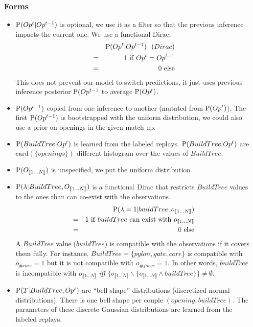 \subsubsection{Forms}
\begin{itemize}
\item $\mathrm{P}(Op^t | Op^{t-1})$ is optional, we use it as a filter so that the previous inference impacts the current one. We use a functional Dirac:
\begin{eqnarray*}
& & \mathrm{P}(Op^t|Op^{t-1})\ \  (Dirac)\\
& = & 1\ \mathrm{if}\ Op^t = Op^{t-1}\\
& = & 0\ \mathrm{else}
\end{eqnarray*}
This does not prevent our model to switch predictions, it just uses previous inference posterior $\mathrm{P}(Op^{t-1}$ to average $\mathrm{P}(Op^t)$.

\item $\mathrm{P}(Op^{t-1})$ copied from one inference to another (mutated from $\mathrm{P}(Op^t)$). The first $\mathrm{P}(Op^{t-1})$ is bootstrapped with the uniform distribution, we could also use a prior on openings in the given match-up.
\item $\mathrm{P}(BuildTree | Op^t)$ is learned from the labeled replays. $\mathrm{P}(BuildTree|Op^t)$ are $\mathrm{card}(\{openings\})$ different histogram over the values of $BuildTree$.
\item $\mathrm{P}(O_{\llbracket 1 \dots N\rrbracket})$ is unspecified, we put the uniform distribution.
\item $\mathrm{P}(\lambda | BuildTree, O_{\llbracket 1 \dots N\rrbracket})$ is a functional Dirac that restricts $BuildTree$ values to the ones than can co-exist with the observations.
\begin{eqnarray*}
& & \mathrm{P}(\lambda = 1 | buildTree, o_{\llbracket 1 \dots N\rrbracket}) \\
& = & 1\ \mathrm{if\ } buildTree \ \mathrm{can\ exist\ with\ } o_{\llbracket 1\dots N\rrbracket} \\
& = & 0\ \mathrm{else}
\end{eqnarray*}
A $BuildTree$ value ($buildTree$) is compatible with the observations if it covers them fully. For instance, $BuildTree=\{pylon, gate, core\}$ is compatible with $o_{\#core} = 1$ but it is not compatible with $o_{\#forge} = 1$. In other words, $buildTree$ is incompatible with $o_{\llbracket 1\dots N\rrbracket}$ \textit{iff} $\{o_{\llbracket 1\dots N\rrbracket} \backslash \{o_{\llbracket 1\dots N\rrbracket} \wedge buildTree\}\} \neq \emptyset$.
\item $\mathrm{P}(T | BuildTree, Op^t)$ are ``bell shape'' distributions (discretized normal distributions). There is one bell shape per couple $(opening, buildTree)$. The parameters of these discrete Gaussian distributions are learned from the labeled replays.
\end{itemize}

